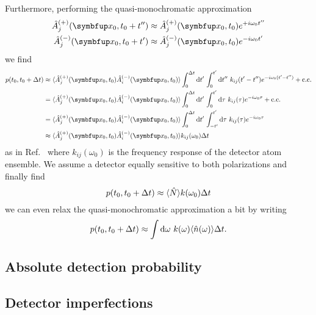 Furthermore, performing the quasi-monochromatic approximation
\begin{align}
	\hat{A}_j^{(+)}(\vb{x}_0,t_0+t^{\prime\prime})
	&\approx
	\hat{A}_j^{(+)}(\vb{x}_0,t_0)
	e^{+i\omega_0t^{\prime\prime}}
	\\
	\hat{A}_j^{(-)}(\vb{x}_0,t_0+t^{\prime})
	&\approx
	\hat{A}_j^{(-)}(\vb{x}_0,t_0)
	e^{-i\omega_0t^{\prime}}
\end{align}
we find
\begin{equation}
	\begin{split}
		p(t_0,t_0+\Delta t)
		&\approx
		\expval{
			\hat{A}_j^{(+)}(\vb{x}_0,t_0)
			\hat{A}_i^{(-)}(\vb{x}_0,t_0)
		}
		\int_0^{\Delta t}\dd{t^\prime}
		\int_0^{t^\prime}\dd{t^{\prime\prime}}
		k_{ij}(t^{\prime}-t^{\prime\prime})
		e^{-i\omega_0(t^\prime-t^{\prime\prime})}
		+
		\text{c.c.}
		\\
		&=
		\expval{
			\hat{A}_j^{(+)}(\vb{x}_0,t_0)
			\hat{A}_i^{(-)}(\vb{x}_0,t_0)
		}
		\int_0^{\Delta t}\dd{t^\prime}
		\int_0^{t^\prime}\dd{\tau}
		k_{ij}(\tau)
		e^{-i\omega_0\tau}
		+
		\text{c.c.}
		\\
		&=
		\expval{
			\hat{A}_j^{(+)}(\vb{x}_0,t_0)
			\hat{A}_i^{(-)}(\vb{x}_0,t_0)
		}
		\int_0^{\Delta t}\dd{t^\prime}
		\int_{-t^\prime}^{t^\prime}\dd{\tau}
		k_{ij}(\tau)
		e^{-i\omega_0\tau}
		\\
		&\approx
		\expval{
			\hat{A}_j^{(+)}(\vb{x}_0,t_0)
			\hat{A}_i^{(-)}(\vb{x}_0,t_0)
		}
		k_{ij}(\omega_0)
		\Delta t
	\end{split}
\end{equation}
as in Ref.~\cite[p.~699]{Mandel1995} where $k_{ij}(\omega_0)$ is the frequency response of the detector atom ensemble.
We assume a detector equally sensitive to both polarizations and finally find
\begin{equation}
	p(t_0,t_0+\Delta t)
	\approx
	\langle\hat{N}\rangle
	k(\omega_0)
	\Delta t
\end{equation}
we can even relax the quasi-monochromatic approximation a bit by writing
\begin{equation}
	p(t_0,t_0+\Delta t)
	\approx
	\int\dd{\omega}
	k(\omega)
	\expval{\hat{n}(\omega)}
	\Delta t
	.
\end{equation}

\subsection{Absolute detection probability}

\subsection{Detector imperfections}

